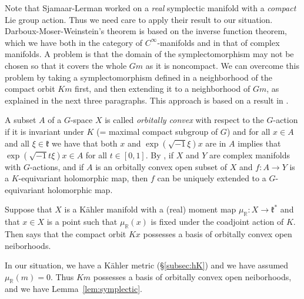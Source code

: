 \documentclass[12pt]{amsart}
\def\Bbb{\mathbb}
\theoremstyle{definition}
\theoremstyle{remark}
\numberwithin{equation}{subsection}
\newcommand{\lemref}[1]{Lemma~\ref{#1}}
\newcommand{\subsecref}[1]{\S\ref{#1}}
\newcommand{\R}{{\Bbb R}}
\begin{document}
Note that Sjamaar-Lerman worked on a {\it real\/} symplectic manifold
with a {\it compact\/} Lie group action. Thus we need care to apply
their result to our situation. Darboux-Moser-Weinstein's theorem is
based on the inverse function theorem, which we have both in the
category of $C^\infty$-manifolds and in that of complex
manifolds.
%
A problem is that the domain of the symplectomorphism may not be
chosen so that it covers the whole $Gm$ as it is noncompact.
%
We can overcome this problem by taking a symplectomorphism defined in
a neighborhood of the compact orbit $Km$ first, and then extending it
to a neighborhood of $Gm$, as explained in the next three paragraphs.
%
This approach is based on a result in \cite{Sj}.

A subset $A$ of a $G$-space $X$ is called {\it orbitally convex\/}
with respect to the $G$-action if it is invariant under $K$ (= maximal
compact subgroup of $G$) and for all $x\in A$ and all $\xi\in\mathfrak
k$ we have that both $x$ and $\exp(\sqrt{-1}\xi)x$ are in $A$ implies
that $\exp(\sqrt{-1}t\xi)x\in A$ for all $t\in [0,1]$.
%
By \cite[1.4]{Sj}, if $X$ and $Y$ are complex manifolds with
$G$-actions, and if $A$ is an orbitally convex open subset of $X$ and
$f\colon A\to Y$ is a $K$-equivariant holomorphic map, then $f$ can be
uniquely extended to a $G$-equivariant holomorphic map.

Suppose that $X$ is a K\"ahler manifold with a (real) moment map
$\mu_\R\colon X\to \mathfrak k^*$ and that $x\in X$ is a point such
that $\mu_\R(x)$ is fixed under the coadjoint action of $K$. Then
\cite[Claim~1.13]{Sj} says that the compact orbit $Kx$ possesses a
basis of orbitally convex open neiborhoods.

In our situation, we have a K\"ahler metric (\subsecref{subsec:hK})
and we have assumed $\mu_\R(m) = 0$. Thus $Km$ possesses a basis of
orbitally convex open neiborhoods, and we have
\lemref{lem:symplectic}.
\end{document}

